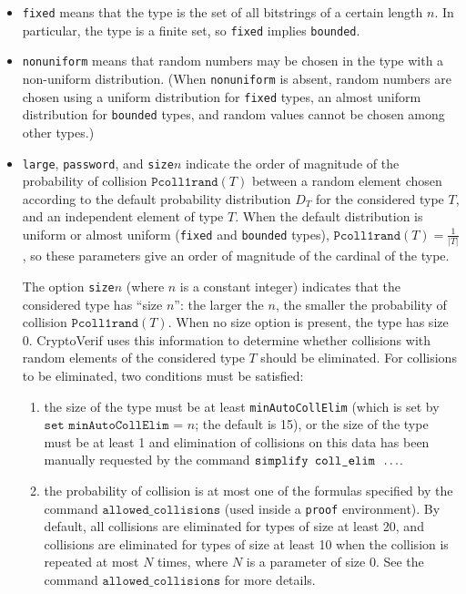 \begin{itemize}
\begin{itemize}
\item \texttt{fixed} means that the type is the set of all bitstrings of 
a certain length $n$. In particular, the type is a finite set,
so \texttt{fixed} implies \texttt{bounded}. 

\item \texttt{nonuniform} means that random numbers may be chosen in the
type with a non-uniform distribution. (When \texttt{nonuniform} is absent,
random numbers are chosen using a uniform distribution for {\tt fixed} types,
an almost uniform distribution for \texttt{bounded} types, and random values
cannot be chosen among other types.)

\item \texttt{large}, \texttt{password}, and \texttt{size$n$} indicate 
the order of magnitude of the probability of collision $\texttt{Pcoll1rand}(T)$
between a random element
chosen according to the default probability distribution $D_T$ for the considered type $T$,
and an independent element of type $T$. When the default distribution is uniform
or almost uniform ({\tt fixed} and {\tt bounded} types), $\texttt{Pcoll1rand}(T) = \frac{1}{|T|}$,
so these parameters give an order of magnitude of the cardinal of the type.

The option \texttt{size$n$} (where $n$ is a constant integer) indicates
that the considered type has ``size $n$'': the larger the $n$, the
smaller the probability of collision $\texttt{Pcoll1rand}(T)$.
When no size option is present, the type has size 0.
CryptoVerif uses this information to determine whether collisions 
with random elements of the considered type $T$ should be eliminated.
For collisions to be eliminated, two conditions must be satisfied:
\begin{enumerate}

\item the size of the type must be at least \texttt{minAutoCollElim}
(which is set by $\texttt{set minAutoCollElim = }n$; the default is 15),
or the size of the type must be at least 1 and elimination of collisions
on this data has been manually requested by the command 
$\texttt{simplify coll\string_elim }\ldots$.

\item the probability of collision is at most one of the formulas
specified by the command $\texttt{allowed\_collisions}$
(used inside a {\tt proof} environment).
By default, all collisions are eliminated for types of size at least 20,
and collisions are eliminated for types of size at least 10 when
the collision is repeated at most $N$ times, where $N$ is a parameter of size 0.
See the command $\texttt{allowed\_collisions}$ for more details.


\end{enumerate}
\end{itemize}
\end{itemize}
